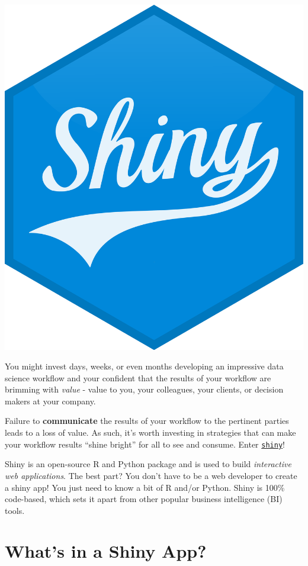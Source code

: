\documentclass[
  letterpaper,
  DIV=11,
  numbers=noendperiod]{scrreprt}
\begin{document}
\includegraphics{images/shiny.png}

You might invest days, weeks, or even months developing an impressive
data science workflow and your confident that the results of your
workflow are brimming with \emph{value} - value to you, your colleagues,
your clients, or decision makers at your company.

Failure to \textbf{communicate} the results of your workflow to the
pertinent parties leads to a loss of value. As such, it's worth
investing in strategies that can make your workflow results ``shine
bright'' for all to see and consume. Enter
\href{https://shiny.posit.co/}{\texttt{shiny}}!

Shiny is an open-source R and Python package and is used to build
\emph{interactive web applications}. The best part? You don't have to be
a web developer to create a shiny app! You just need to know a bit of R
and/or Python. Shiny is 100\% code-based, which sets it apart from other
popular business intelligence (BI) tools.

\section{What's in a Shiny App?}\label{whats-in-a-shiny-app}
\end{document}
